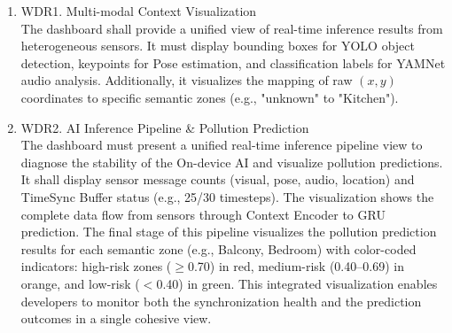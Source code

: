 \documentclass[conference]{IEEEtran}
\begin{document}
\begin{enumerate}
    \item [1)] WDR1. Multi-modal Context Visualization \\
    The dashboard shall provide a unified view of real-time inference results from heterogeneous sensors. It must display bounding boxes for YOLO object detection, keypoints for Pose estimation, and classification labels for YAMNet audio analysis. Additionally, it visualizes the mapping of raw $(x, y)$ coordinates to specific semantic zones (e.g., "unknown" to "Kitchen").

    \item [2)] WDR2. AI Inference Pipeline \& Pollution Prediction \\
    The dashboard must present a unified real-time inference pipeline view to diagnose the stability of the On-device AI and visualize pollution predictions. It shall display sensor message counts (visual, pose, audio, location) and TimeSync Buffer status (e.g., 25/30 timesteps). The visualization shows the complete data flow from sensors through Context Encoder to GRU prediction. The final stage of this pipeline visualizes the pollution prediction results for each semantic zone (e.g., Balcony, Bedroom) with color-coded indicators: high-risk zones ($\geq$0.70) in red, medium-risk (0.40–0.69) in orange, and low-risk ($<$0.40) in green. This integrated visualization enables developers to monitor both the synchronization health and the prediction outcomes in a single cohesive view.
\end{enumerate}
\end{document}
